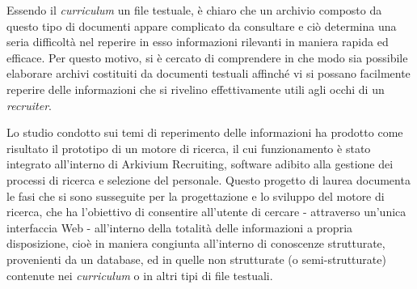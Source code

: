 Essendo il \textit{curriculum} un file testuale, è chiaro che un archivio composto da questo tipo di documenti appare complicato da consultare e ciò determina una seria difficoltà nel reperire in esso informazioni rilevanti in maniera rapida ed efficace. Per questo motivo, si è cercato di comprendere in che modo sia possibile elaborare archivi costituiti da documenti testuali affinché vi si possano facilmente reperire delle informazioni che si rivelino effettivamente utili agli occhi di un \textit{recruiter}.

\vspace{1em}

Lo studio condotto sui temi di reperimento delle informazioni ha prodotto come risultato il prototipo di un motore di ricerca, il cui funzionamento è stato integrato all’interno di Arkivium Recruiting, software adibito alla gestione dei processi di ricerca e selezione del personale. Questo progetto di laurea documenta le fasi che si sono susseguite per la progettazione e lo sviluppo del motore di ricerca, che ha l’obiettivo di consentire all’utente di cercare - attraverso un’unica interfaccia Web - all’interno della totalità delle informazioni a propria disposizione, cioè in maniera congiunta all’interno di conoscenze strutturate, provenienti da un database, ed in quelle non strutturate (o semi-strutturate) contenute nei \textit{curriculum} o in altri tipi di file testuali.

















